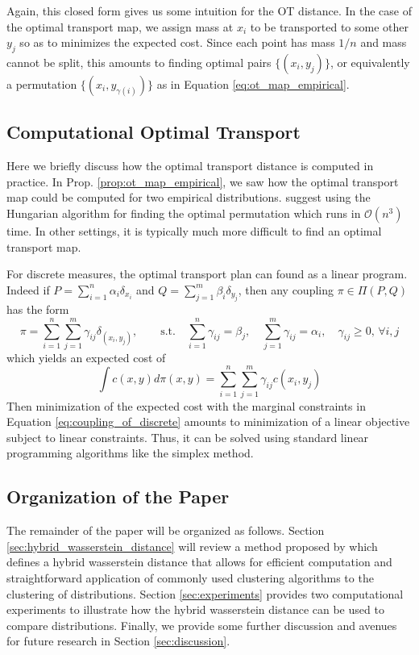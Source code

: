 \documentclass[11pt, a4paper, fleqn]{article}
\let\normalint\int %
\def\int{\displaystyle\normalint} %
\numberwithin{equation}{section}
\numberwithin{figure}{section}
\numberwithin{table}{section}
\renewcommand{\geq}{\geqslant}
\begin{document}
Again, this closed form gives us some intuition for the OT distance. In the case of the optimal transport map, we assign mass at $x_i$ to be transported to some other $y_j$ so as to minimizes the expected cost. Since each point has mass $1/n$ and mass cannot be split, this amounts to finding optimal pairs $\{(x_i, y_j)\}$, or equivalently a permutation $\{(x_i, y_{\gamma(i)})\}$ as in Equation \eqref{eq:ot_map_empirical}.

\subsection{Computational Optimal Transport}
Here we briefly discuss how the optimal transport distance is computed in practice. In Prop. \ref{prop:ot_map_empirical}, we saw how the optimal transport map could be computed for two empirical distributions. \cite{verdinelli2018hybrid} suggest using the Hungarian algorithm for finding the optimal permutation which runs in $\mathcal{O}(n^3)$ time. In other settings, it is typically much more difficult to find an optimal transport map.

For discrete measures, the optimal transport plan can found as a linear program. Indeed if $P = \sum_{i=1}^n \alpha_i\delta_{x_i}$ and $Q = \sum_{j=1}^m \beta_i \delta_{y_j}$, then any coupling $\pi \in \Pi(P, Q)$ has the form
\begin{equation}\label{eq:coupling_of_discrete}
\pi = \sum\limits_{i=1}^n \sum\limits_{j=1}^m \gamma_{ij} \delta_{(x_i, y_j)}, \quad\quad\mbox{s.t.} \quad \sum\limits_{i=1}^n \gamma_{ij} = \beta_j, \quad \sum\limits_{j=1}^m \gamma_{ij} = \alpha_i, \quad \gamma_{ij} \geq 0, \, \forall i, j
\end{equation}
which yields an expected cost of
\begin{equation}
\int c(x, y) d\pi(x, y) = \sum\limits_{i=1}^n \sum\limits_{j=1}^m \gamma_{ij} c(x_i, y_j)
\end{equation}
Then minimization of the expected cost with the marginal constraints in Equation \eqref{eq:coupling_of_discrete} amounts to minimization of a linear objective subject to linear constraints. Thus, it can be solved using standard linear programming algorithms like the simplex method.

\subsection{Organization of the Paper}
The remainder of the paper will be organized as follows. Section \ref{sec:hybrid_wasserstein_distance} will review a method proposed by \cite{verdinelli2018hybrid} which defines a hybrid wasserstein distance that allows for efficient computation and straightforward application of commonly used clustering algorithms to the clustering of distributions. Section \ref{sec:experiments} provides two computational experiments to illustrate how the hybrid wasserstein distance can be used to compare distributions. Finally, we provide some further discussion and avenues for future research in Section \ref{sec:discussion}.
\end{document}
